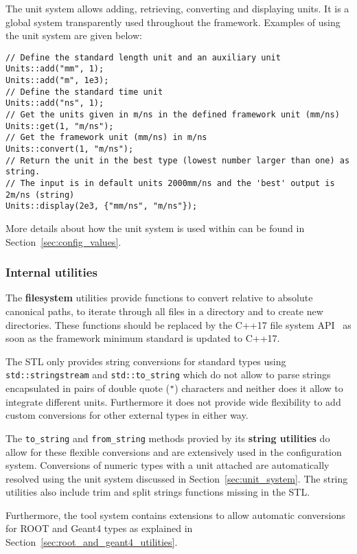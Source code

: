 The unit system allows adding, retrieving, converting and displaying units.
It is a global system transparently used throughout the framework.
Examples of using the unit system are given below:
\begin{verbatim}
// Define the standard length unit and an auxiliary unit
Units::add("mm", 1);
Units::add("m", 1e3);
// Define the standard time unit
Units::add("ns", 1);
// Get the units given in m/ns in the defined framework unit (mm/ns)
Units::get(1, "m/ns");
// Get the framework unit (mm/ns) in m/ns
Units::convert(1, "m/ns");
// Return the unit in the best type (lowest number larger than one) as string.
// The input is in default units 2000mm/ns and the 'best' output is 2m/ns (string)
Units::display(2e3, {"mm/ns", "m/ns"});
\end{verbatim}

More details about how the unit system is used within \apsq can be found in Section~\ref{sec:config_values}.

\subsubsection{Internal utilities}
\label{sec:filesystem}
The \textbf{filesystem} utilities provide functions to convert relative to absolute canonical paths, to iterate through all files in a directory and to create new directories.
These functions should be replaced by the C++17 file system API~\cite{cppfilesystem} as soon as the framework minimum standard is updated to C++17.

\label{sec:string_utilities}
The STL only provides string conversions for standard types using \texttt{std::stringstream} and \texttt{std::to\_string} which do not allow to parse strings encapsulated in pairs of double quote (\texttt{"}) characters and neither does it allow to integrate different units.
Furthermore it does not provide wide flexibility to add custom conversions for other external types in either way.

The \apsq \texttt{to\_string} and \texttt{from\_string} methods provied by its \textbf{string utilities} do allow for these flexible conversions and are extensively used in the configuration system.
Conversions of numeric types with a unit attached are automatically resolved using the unit system discussed in Section~\ref{sec:unit_system}.
The string utilities also include trim and split strings functions missing in the STL.

Furthermore, the \apsq tool system contains extensions to allow automatic conversions for ROOT and Geant4 types as explained in Section~\ref{sec:root_and_geant4_utilities}.


